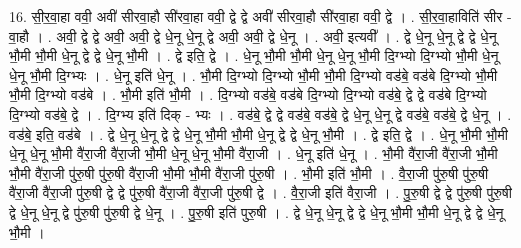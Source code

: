 \documentclass[17pt]{extarticle}
\begin{document}
16. सी॒र॒वा॒हा ववी॒ अवी॑ सीरवा॒हौ सी॑रवा॒हा ववी॒ द्वे द्वे अवी॑ सीरवा॒हौ सी॑रवा॒हा ववी॒ द्वे । . सी॒र॒वा॒हाविति॑ सीर - वा॒हौ । . अवी॒ द्वे द्वे अवी॒ अवी॒ द्वे धे॒नू धे॒नू द्वे अवी॒ अवी॒ द्वे धे॒नू । . अवी॒ इत्यवी᳚ । . द्वे धे॒नू धे॒नू द्वे द्वे धे॒नू भौ॒मी भौ॒मी धे॒नू द्वे द्वे धे॒नू भौ॒मी । . द्वे इति॒ द्वे । . धे॒नू भौ॒मी भौ॒मी धे॒नू धे॒नू भौ॒मी दि॒ग्भ्यो दि॒ग्भ्यो भौ॒मी धे॒नू धे॒नू भौ॒मी दि॒ग्भ्यः । . धे॒नू इति॑ धे॒नू । . भौ॒मी दि॒ग्भ्यो दि॒ग्भ्यो भौ॒मी भौ॒मी दि॒ग्भ्यो वड॑बे॒ वड॑बे दि॒ग्भ्यो भौ॒मी भौ॒मी दि॒ग्भ्यो वड॑बे । . भौ॒मी इति॑ भौ॒मी । . दि॒ग्भ्यो वड॑बे॒ वड॑बे दि॒ग्भ्यो दि॒ग्भ्यो वड॑बे॒ द्वे द्वे वड॑बे दि॒ग्भ्यो दि॒ग्भ्यो वड॑बे॒ द्वे । . दि॒ग्भ्य इति॑ दिक् - भ्यः । . वड॑बे॒ द्वे द्वे वड॑बे॒ वड॑बे॒ द्वे धे॒नू धे॒नू द्वे वड॑बे॒ वड॑बे॒ द्वे धे॒नू । . वड॑बे॒ इति॒ वड॑बे । . द्वे धे॒नू धे॒नू द्वे द्वे धे॒नू भौ॒मी भौ॒मी धे॒नू द्वे द्वे धे॒नू भौ॒मी । . द्वे इति॒ द्वे । . धे॒नू भौ॒मी भौ॒मी धे॒नू धे॒नू भौ॒मी वै॑रा॒जी वै॑रा॒जी भौ॒मी धे॒नू धे॒नू भौ॒मी वै॑रा॒जी । . धे॒नू इति॑ धे॒नू । . भौ॒मी वै॑रा॒जी वै॑रा॒जी भौ॒मी भौ॒मी वै॑रा॒जी पु॑रु॒षी पु॑रु॒षी वै॑रा॒जी भौ॒मी भौ॒मी वै॑रा॒जी पु॑रु॒षी । . भौ॒मी इति॑ भौ॒मी । . वै॒रा॒जी पु॑रु॒षी पु॑रु॒षी वै॑रा॒जी वै॑रा॒जी पु॑रु॒षी द्वे द्वे पु॑रु॒षी वै॑रा॒जी वै॑रा॒जी पु॑रु॒षी द्वे । . वै॒रा॒जी इति॑ वैरा॒जी । . पु॒रु॒षी द्वे द्वे पु॑रु॒षी पु॑रु॒षी द्वे धे॒नू धे॒नू द्वे पु॑रु॒षी पु॑रु॒षी द्वे धे॒नू । . पु॒रु॒षी इति॑ पुरु॒षी । . द्वे धे॒नू धे॒नू द्वे द्वे धे॒नू भौ॒मी भौ॒मी धे॒नू द्वे द्वे धे॒नू भौ॒मी । \newline
\end{document}
